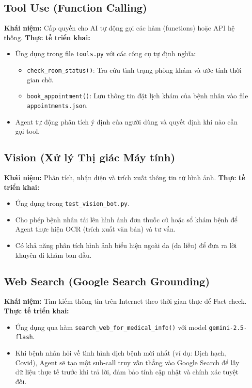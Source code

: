 \documentclass[12pt]{article}
\begin{document}
\subsection{Tool Use (Function Calling)}
\textbf{Khái niệm:} Cấp quyền cho AI tự động gọi các hàm (functions) hoặc API hệ thống.
\textbf{Thực tế triển khai:}
\begin{itemize}
    \item Ứng dụng trong file \texttt{tools.py} với các công cụ tự định nghĩa:
    \begin{itemize}
        \item \texttt{check\_room\_status()}: Tra cứu tình trạng phòng khám và ước tính thời gian chờ.
        \item \texttt{book\_appointment()}: Lưu thông tin đặt lịch khám của bệnh nhân vào file \texttt{appointments.json}.
    \end{itemize}
    \item Agent tự động phân tích ý định của người dùng và quyết định khi nào cần gọi tool.
\end{itemize}

\subsection{Vision (Xử lý Thị giác Máy tính)}
\textbf{Khái niệm:} Phân tích, nhận diện và trích xuất thông tin từ hình ảnh.
\textbf{Thực tế triển khai:}
\begin{itemize}
    \item Ứng dụng trong \texttt{test\_vision\_bot.py}.
    \item Cho phép bệnh nhân tải lên hình ảnh đơn thuốc cũ hoặc sổ khám bệnh để Agent thực hiện OCR (trích xuất văn bản) và tư vấn.
    \item Có khả năng phân tích hình ảnh biểu hiện ngoài da (da liễu) để đưa ra lời khuyên đi khám ban đầu.
\end{itemize}

\subsection{Web Search (Google Search Grounding)}
\textbf{Khái niệm:} Tìm kiếm thông tin trên Internet theo thời gian thực để Fact-check.
\textbf{Thực tế triển khai:}
\begin{itemize}
    \item Ứng dụng qua hàm \texttt{search\_web\_for\_medical\_info()} với model \texttt{gemini-2.5-flash}.
    \item Khi bệnh nhân hỏi về tình hình dịch bệnh mới nhất (ví dụ: Dịch hạch, Covid), Agent sẽ tạo một sub-call truy vấn thẳng vào Google Search để lấy dữ liệu thực tế trước khi trả lời, đảm bảo tính cập nhật và chính xác tuyệt đối.
\end{itemize}
\end{document}
